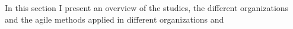 In this section I present an overview of the studies, the different
organizations and the agile methods applied in different organizations
and
